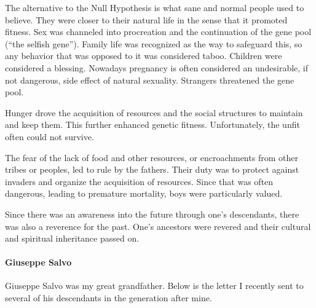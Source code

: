 The alternative to the Null Hypothesis is what sane and normal people used to believe. They were closer to their natural life in the sense that it promoted fitness. Sex was channeled into procreation and the continuation of the gene pool (``the selfish gene''). Family life was recognized as the way to safeguard this, so any behavior that was opposed to it was considered taboo. Children were considered a blessing. Nowadays pregnancy is often considered an undesirable, if not dangerous, side effect of natural sexuality. Strangers threatened the gene pool.

Hunger drove the acquisition of resources and the social structures to maintain and keep them. This further enhanced genetic fitness. Unfortunately, the unfit often could not survive.

The fear of the lack of food and other resources, or encroachments from other tribes or peoples, led to rule by the fathers. Their duty was to protect against invaders and organize the acquisition of resources. Since that was often dangerous, leading to premature mortality, boys were particularly valued.

Since there was an awareness into the future through one's descendants, there was also a reverence for the past. One's ancestors were revered and their cultural and spiritual inheritance passed on.

\paragraph{Giuseppe Salvo}

Giuseppe Salvo was my great grandfather. Below is the letter I recently sent to several of his descendants in the generation after mine.

